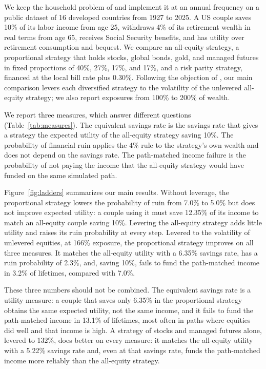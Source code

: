 \documentclass[12pt]{article}
\makeatletter
\newif\ifsubmission
\newcommand{\exhibitlist}{}
\newcommand{\exhibit}[1]{\ifsubmission\g@addto@macro\exhibitlist{}\else\fi}
\makeatother
\begin{document}
We keep the household problem of \citet{AnarkulovaCederburgODoherty2025} and implement it at an annual
frequency on a public dataset of 16 developed countries from 1927 to 2025. A US couple saves 10\% of its
labor income from age 25, withdraws 4\% of its retirement wealth in real terms from age 65, receives
Social Security benefits, and has utility over retirement consumption and bequest. We compare an
all-equity strategy, a proportional strategy that holds stocks, global bonds, gold, and managed futures in
fixed proportions of 40\%, 27\%, 17\%, and 17\%, and a risk parity strategy, financed at the local bill
rate plus 0.30\%. Following the objection of \citet{Asness2024}, our main comparison levers each
diversified strategy to the volatility of the unlevered all-equity strategy; we also report exposures
from 100\% to 200\% of wealth.

We report three measures, which answer different questions (Table~\ref{tab:measures}). The equivalent
savings rate is the savings rate that gives a strategy the expected utility of the all-equity strategy
saving 10\%. The probability of financial ruin applies the 4\% rule to the strategy's own wealth and does
not depend on the savings rate. The path-matched income failure is the probability of not paying the
income that the all-equity strategy would have funded on the same simulated path.

Figure~\ref{fig:ladders} summarizes our main results. Without leverage, the proportional strategy lowers
the probability of ruin from 7.0\% to 5.0\% but does not improve expected utility: a couple using it must
save 12.35\% of its income to match an all-equity couple saving 10\%. Levering the all-equity strategy adds
little utility and raises its ruin probability at every step. Levered to the volatility of unlevered
equities, at 166\% exposure, the proportional strategy improves on all three measures. It matches the
all-equity utility with a 6.35\% savings rate, has a ruin probability of 2.3\%, and, saving 10\%, fails to
fund the path-matched income in 3.2\% of lifetimes, compared with 7.0\%.
\exhibit{figures/erc/fig_ladders.tex}

These three numbers should not be combined. The equivalent savings rate is a utility measure: a couple
that saves only 6.35\% in the proportional strategy obtains the same expected utility, not the same
income, and it fails to fund the path-matched income in 13.1\% of lifetimes, most often in paths where
equities did well and that income is high. A strategy of stocks and managed futures alone, levered to
132\%, does better on every measure: it matches the all-equity utility with a 5.22\% savings rate and, even
at that savings rate, funds the path-matched income more reliably than the all-equity strategy.
\end{document}
